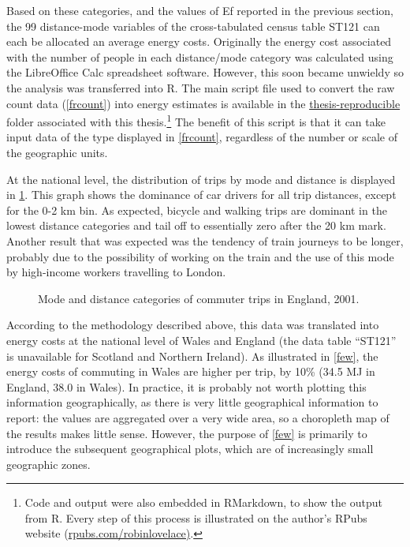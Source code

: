 Based on these categories, and the values of Ef reported in the previous section,
the 99 distance-mode variables of the cross-tabulated
census table ST121 can each be allocated an average energy
costs.
Originally the energy cost associated with the number of people in
each distance/mode category was calculated using the LibreOffice Calc
spreadsheet software. However, this soon became unwieldy so the analysis
was transferred into R. The main script file used to convert the raw
count data (\cref{frcount}) into energy estimates is available in the
{\color{blue} \href{https://github.com/Robinlovelace/thesis-reproducible}
{thesis-reproducible}} folder associated with this
thesis.\footnote{Code %
and output were also embedded in RMarkdown, to show the output from R.
Every step of this process is illustrated on the author's RPubs website
(\href{http://rpubs.com/RobinLovelace/7178}{rpubs.com/robinlovelace)}.}
The benefit of this script is that it can take input data of the type
displayed in \cref{frcount}, regardless of the number or scale of the
geographic units.

At the national level, the distribution of trips by mode and distance is
displayed in \cref{fengmodedis}. This graph shows the
dominance of car drivers for all trip distances, except for the 0-2 km bin.
As expected, bicycle and walking trips are dominant in the lowest
distance categories and tail off to essentially zero after the 20 km mark.
Another result that was expected was the tendency of train journeys to
be longer, probably due to the possibility of working on the train and
the use of this mode by high-income workers travelling to London.

\begin{figure}[htbp]
  \caption[Mode and distance categories of commute in England]
  {Mode and distance categories of commuter trips in England, 2001.}
  \label{fengmodedis}
\end{figure} %

According to the methodology described above,
this data was translated into energy costs at the national level of
Wales and England (the data table ``ST121'' is unavailable for Scotland and
Northern Ireland). As illustrated in \cref{few}, the energy costs of commuting
in Wales are higher per trip, by 10\% (34.5 MJ in England, 38.0 in Wales).
In practice, it is probably not worth plotting this information geographically,
as there is very little geographical information to report:
the values are aggregated over a very wide area, so a choropleth map
of the results makes little sense. However, the purpose of  \cref{few}
is primarily to introduce the subsequent geographical plots, which
are of increasingly small geographic zones.

